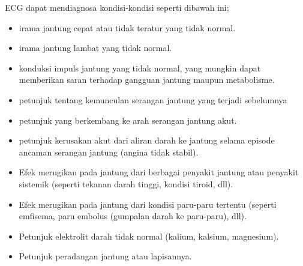 \noindent ECG dapat mendiagnosa kondisi-kondisi seperti dibawah ini;
\begin{itemize}
   \item irama jantung cepat atau tidak teratur yang tidak normal.
   \item irama jantung lambat yang tidak normal.
	\item konduksi impuls jantung yang tidak normal, yang mungkin dapat memberikan
	saran terhadap gangguan jantung maupun metabolisme.
	\item petunjuk tentang kemunculan serangan jantung yang terjadi sebelumnya
	\item petunjuk yang berkembang ke arah serangan jantung akut.
	\item petunjuk kerusakan akut dari aliran darah ke  jantung selama episode
	ancaman serangan jantung (angina tidak stabil).
	\item Efek merugikan pada jantung dari berbagai  penyakit jantung atau penyakit
	sistemik (seperti tekanan darah tinggi, kondisi tiroid, dll).
	\item Efek merugikan pada jantung dari kondisi  paru-paru tertentu (seperti
	emfisema, paru embolus (gumpalan darah ke paru-paru), dll).
	\item Petunjuk elektrolit darah tidak normal (kalium, kalsium, magnesium).
	\item Petunjuk peradangan jantung atau lapisannya.
\end{itemize}

